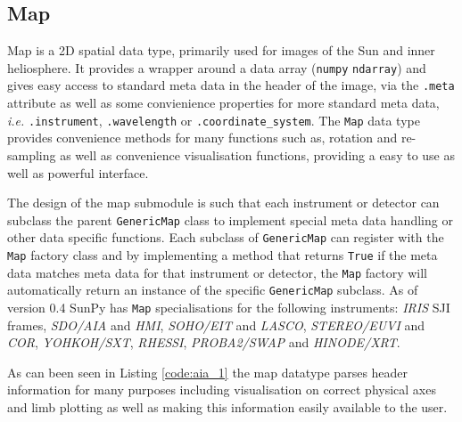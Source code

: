 \subsection{Map}
Map is a 2D spatial data type, primarily used for images of the Sun and 
inner heliosphere. It provides a wrapper around a data array (\texttt{numpy} 
\texttt{ndarray}) and gives easy access to standard meta data in the header of 
the image, via the \texttt{.meta} attribute as well as some convienience 
properties for more standard meta data, \textit{i.e.} \texttt{.instrument}, 
\texttt{.wavelength} or \texttt{.coordinate\_system}.
The \texttt{Map} data type provides convenience methods for many functions 
such as, rotation and re-sampling as well as convenience visualisation 
functions, providing a easy to use as well as powerful interface.

The design of the map submodule is such that each instrument or 
detector can subclass the parent \texttt{GenericMap} class to implement 
special meta data handling or other data specific functions. Each subclass 
of \texttt{GenericMap} can register with the \texttt{Map} factory class and 
by implementing a method that returns \texttt{True} if the meta data 
matches meta data for that instrument or detector, the \texttt{Map} factory 
will automatically return an instance of the specific \texttt{GenericMap} 
subclass. As of version 0.4 SunPy has \texttt{Map} specialisations for the 
following instruments: \textit{IRIS} SJI frames, \textit{SDO/AIA} and 
\textit{HMI}, \textit{SOHO/EIT} and	\textit{LASCO}, \textit{STEREO/EUVI} and 
\textit{COR}, \textit{YOHKOH/SXT}, \textit{RHESSI}, \textit{PROBA2/SWAP} and 
\textit{HINODE/XRT}.

As can been seen in Listing \ref{code:aia_1} the map datatype parses header 
information for many purposes including visualisation on correct physical axes 
and limb plotting as well as making this information easily available to the 
user.


